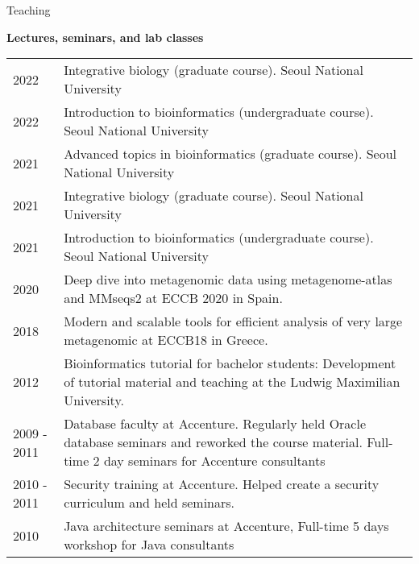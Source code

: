 \documentclass{resume} %
\begin{document}
\begin{rSection}{Teaching}
\vspace{2mm}

{\bf Lectures, seminars, and lab classes}\vspace{1mm}

\begin{tabular}{p{2.5cm}p{14.1cm}}
2022 & Integrative biology (graduate course). Seoul National University 
\\[1.mm] 
2022 & Introduction to bioinformatics (undergraduate course). Seoul National University 
\\[1.mm] 
2021 & Advanced topics in bioinformatics (graduate course). Seoul National University 
\\[1.mm] 
2021 & Integrative biology (graduate course). Seoul National University 
\\[1.mm] 
2021 & Introduction to bioinformatics (undergraduate course). Seoul National University 
\\[1.mm] 
2020 & Deep dive into metagenomic data using metagenome-atlas and MMseqs2 at ECCB 2020 in Spain.
\\[1.mm] 
2018 & Modern and scalable tools for efficient analysis of very large metagenomic at ECCB18 in Greece. 
\\[1.mm] 
2012 & Bioinformatics tutorial for bachelor students: Development of tutorial material and teaching at the Ludwig Maximilian University. 
\\[1.mm] 
2009 - 2011 & Database faculty at Accenture. Regularly held Oracle database seminars and reworked the course material. Full-time 2 day seminars for Accenture consultants 
\\[1.mm] 
2010 - 2011 & Security training at Accenture. Helped create a security curriculum and held seminars.
\\[1.mm] 
2010  & Java architecture seminars at Accenture, Full-time 5 days workshop for Java consultants 
\\[1mm]
\end{tabular}
\vspace{1mm}


\end{rSection}
\end{document}
